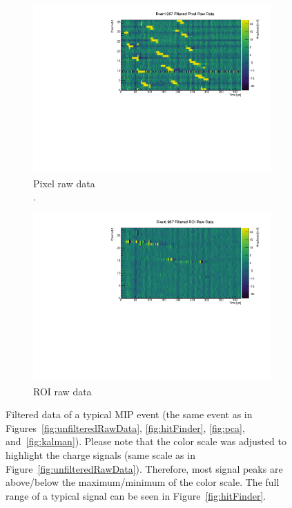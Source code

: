 \documentclass[instruments,article,accept,moreauthors,pdftex]{Definitions/mdpi}
\begin{document}
\begin{figure}[H]
	\centering
	\begin{subfigure}{\textwidth}
		\centering
		\includegraphics[viewport=0 0 550 290, clip, width=\textwidth]{event967_rawFilteredPixel}
		\caption{Pixel raw data\\.}
		\label{fig:filteredRawData_a}
	\end{subfigure}
	\begin{subfigure}{\textwidth}
		\centering
		\includegraphics[viewport=0 0 550 290, clip, width=\textwidth]{event967_rawFilteredROI}
		\caption{ROI raw data}
		\label{fig:filteredRawData_b}
	\end{subfigure}
	\caption{Filtered data of a typical MIP event (the same event as in Figures~\ref{fig:unfilteredRawData}, \ref{fig:hitFinder}, \ref{fig:pca}, and~\ref{fig:kalman}).
		Please note that the color scale was adjusted to highlight the charge signals (same scale as in Figure~\ref{fig:unfilteredRawData}).
		Therefore, most signal peaks are above/below the maximum/minimum of the color scale.
		The full range of a typical signal can be seen in Figure~\ref{fig:hitFinder}.}
	\label{fig:filteredRawData}
\end{figure}
\end{document}
